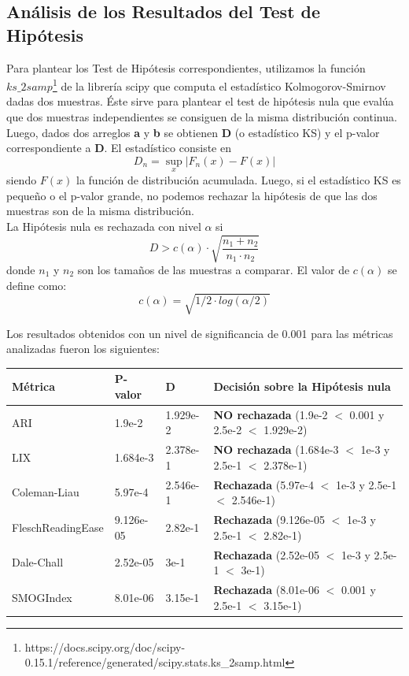 \documentclass[12pt,journal,compsoc]{IEEEtran}
\begin{document}
\subsection{Análisis de los Resultados del Test de Hipótesis}

Para plantear los Test de Hipótesis correspondientes, utilizamos la función $ks\_2samp$\footnote{https://docs.scipy.org/doc/scipy-0.15.1/reference/generated/scipy.stats.ks\_2samp.html} de la librería scipy que computa el estadístico Kolmogorov-Smirnov dadas dos muestras. Éste sirve para plantear el test de hipótesis nula que evalúa que dos muestras independientes se consiguen de la misma distribución continua.\\

Luego, dados dos arreglos \textbf{a} y \textbf{b} se obtienen \textbf{D} (o estadístico KS) y el p-valor correspondiente a \textbf{D}. El estadístico consiste en
$$D_{n}=\sup_{x}|F_{n}(x)-F(x)|$$
siendo $F(x)$ la función de distribución acumulada. Luego, si el estadístico KS es pequeño o el p-valor grande, no podemos rechazar la hipótesis de que las dos muestras son de la misma distribución\cite{degroot}.\\

La Hipótesis nula es rechazada con nivel $\alpha$ si $$D > c(\alpha) \cdot \sqrt{\frac{n_1+n_2}{n_1\cdot n_2}}$$ donde $n_1$ y $n_2$ son los tamaños de las muestras a comparar. El valor de $c(\alpha)$ se define como:
$$c(\alpha) = \sqrt{1/2\cdot log(\alpha/2)}$$

Los resultados obtenidos con un nivel de significancia de 0.001 para las métricas analizadas fueron los siguientes:\\

\begin{tabular}{ | l | l | l | l | }
\hline
Métrica & P-valor & D & Decisión sobre la Hipótesis nula\\
\hline
ARI & 1.9e-2 & 1.929e-2 & \textbf{NO rechazada} (1.9e-2 $<$ 0.001 y 2.5e-2 $<$ 1.929e-2)\\
\hline
LIX & 1.684e-3 & 2.378e-1 & \textbf{NO rechazada} (1.684e-3 $<$ 1e-3 y 2.5e-1 $<$ 2.378e-1)\\
\hline
Coleman-Liau & 5.97e-4 & 2.546e-1 & \textbf{Rechazada} (5.97e-4 $<$ 1e-3 y 2.5e-1 $<$ 2.546e-1)\\
\hline
FleschReadingEase & 9.126e-05 & 2.82e-1 & \textbf{Rechazada} (9.126e-05 $<$ 1e-3 y 2.5e-1 $<$ 2.82e-1)\\
\hline
Dale-Chall & 2.52e-05 & 3e-1 & \textbf{Rechazada} (2.52e-05 $<$ 1e-3 y 2.5e-1 $<$ 3e-1)\\
\hline
SMOGIndex & 8.01e-06 & 3.15e-1 & \textbf{Rechazada} (8.01e-06 $<$ 0.001 y 2.5e-1 $<$ 3.15e-1)\\
\hline
\end{tabular}
\end{document}
